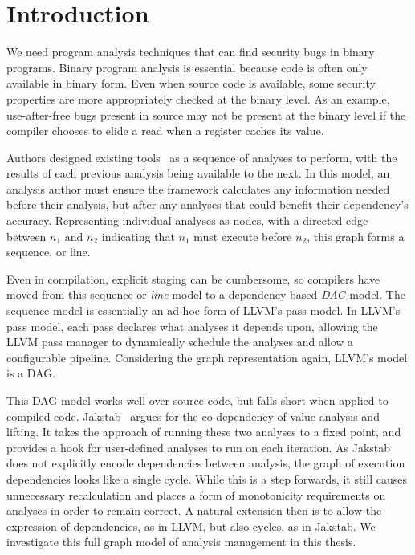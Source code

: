 \chapter{Introduction}
We need program analysis techniques that can find security bugs in binary programs.
Binary program analysis is essential because code is often only available in binary form.
Even when source code is available, some security properties are more appropriately checked at the binary level.
As an example, use-after-free bugs present in source may not be present at the binary level if the compiler chooses to elide a read when a register caches its value.

Authors designed existing tools~\cite{ida, bap, bitblaze, bindead} as a sequence of analyses to perform, with the results of each previous analysis being available to the next.
In this model, an analysis author must ensure the framework calculates any information needed before their analysis, but after any analyses that could benefit their dependency's accuracy.
Representing individual analyses as nodes, with a directed edge between $n_1$ and $n_2$ indicating that $n_1$ must execute before $n_2$, this graph forms a sequence, or line.

Even in compilation, explicit staging can be cumbersome, so compilers have moved from this sequence or \emph{line} model to a dependency-based \emph{DAG} model.
The sequence model is essentially an ad-hoc form of LLVM\cite{llvm}'s pass model.
In LLVM's pass model, each pass declares what analyses it depends upon, allowing the LLVM pass manager to dynamically schedule the analyses and allow a configurable pipeline.
Considering the graph representation again, LLVM's model is a DAG.

This DAG model works well over source code, but falls short when applied to compiled code.
Jakstab~\cite{jakstab} argues for the co-dependency of value analysis and lifting. 
It takes the approach of running these two analyses to a fixed point, and provides a hook for user-defined analyses to run on each iteration.
As Jakstab does not explicitly encode dependencies between analysis, the graph of execution dependencies looks like a single cycle.
While this is a step forwards, it still causes unnecessary recalculation and places a form of monotonicity requirements on analyses in order to remain correct.
A natural extension then is to allow the expression of dependencies, as in LLVM, but also cycles, as in Jakstab.
We investigate this full graph model of analysis management in this thesis.

